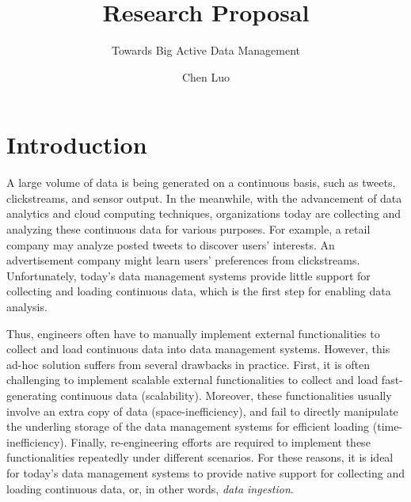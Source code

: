 \documentclass[conference]{llncs}
\subtitle{Towards Big Active Data Management}
\title{Research Proposal}
\author{Chen Luo}
\institute{}
\begin{document}
\maketitle

\section{Introduction}
A large volume of data is being generated on a continuous basis, such as tweets, clickstreams, and sensor output.
In the meanwhile, with the advancement of data analytics and cloud computing techniques, organizations today are collecting and analyzing these continuous data for various purposes.
For example, a retail company may analyze posted tweets to discover users' interests.
An advertisement company might learn users' preferences from clickstreams.
Unfortunately, today's data management systems provide little support for collecting and loading continuous data, which is the first step for enabling data analysis.


Thus, engineers often have to manually implement external functionalities to collect and load continuous data into data management systems.
However, this ad-hoc solution suffers from several drawbacks in practice.
First, it is often challenging to implement scalable external functionalities to collect and load fast-generating continuous data (scalability).
Moreover, these functionalities usually involve an extra copy of data (space-inefficiency), and fail to directly manipulate the underling storage of the data management systems for efficient loading (time-inefficiency).
Finally, re-engineering efforts are required to implement these functionalities repeatedly under different scenarios. 
For these reasons, it is ideal for today's data management systems to provide native support for collecting and loading continuous data, or, in other words, \emph{data ingestion}.
\end{document}
